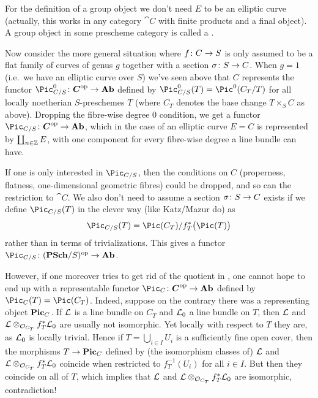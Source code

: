 \documentclass[a4paper,parskip=half,numbers=enddot, DIV=12]{scrreprt}
\begin{document}
	For the definition of a group object we don't need $E$ to be an elliptic curve (actually, this works in any category $\cat C$ with finite products and a final object). A group object in some prescheme category is called a .
	
Now consider the more general situation where $f\colon C\morphism S$ is only assumed to be a flat family of curves of genus $g$ together with a section $\sigma\colon S\morphism C$. When $g=1$ (i.e.\ we have an elliptic curve over $S$) we've seen above that $C$ represents the functor $\Pic_{C/S}^{0}\colon \cat{C}^\op\morphism\cat{Ab}$ defined by $\Pic_{C/S}^0(T)=\Pic^0(C_T/T)$ for all locally noetherian $S$-preschemes $T$ (where $C_T$ denotes the base change $T\times_SC$ as above). Dropping the fibre-wise degree $0$ condition, we get a functor $\Pic_{C/S}\colon \cat{C}^\op\morphism\cat{Ab}$, which in the case of an elliptic curve $E=C$ is represented by $\coprod_{n\in\mathbb{Z}}E$, with one component for every fibre-wise degree a line bundle can have.

If one is only interested in $\Pic_{C/S}$, then the conditions on $C$ (properness, flatness, one-dimensional geometric fibres) could be dropped, and so can the restriction to $\cat{C}$. We also don't need to assume a section $\sigma\colon S\morphism C$ exists if we define $\Pic_{C/S}(T)$ in the clever way (like Katz/Mazur do) as
\begin{align}\lbl{eq:PicCS}
	\Pic_{C/S}(T)=\Pic(C_T)/f_T^*\big(\Pic(T)\big)
\end{align}
rather than in terms of trivializations. This gives a functor $\Pic_{C/S}\colon (\cat{PSch}/S)^\op\morphism\cat{Ab}$.

However, if one moreover tries to get rid of the quotient in , one cannot hope to end up with a representable functor $\Pic_C\colon\cat{C}^\op\morphism\cat{Ab}$ defined by $\Pic_C(T)=\Pic(C_T)$. Indeed, suppose on the contrary there was a representing object $\mathbf{Pic}_C$. If $\mathcal{L}$ is a line bundle on $C_T$ and $\mathcal{L}_0$ a line bundle on $T$, then $\mathcal{L}$ and $\mathcal{L}\otimes_{\mathcal{O}_{C_T}}f_T^*\mathcal{L}_0$ are usually not isomorphic. Yet locally with respect to $T$ they are, as $\mathcal{L}_0$ is locally trivial. Hence if $T=\bigcup_{i\in I}U_i$ is a sufficiently fine open cover, then the morphisms $T\morphism\PIC_C$ defined by (the isomorphism classes of) $\mathcal{L}$ and $\mathcal{L}\otimes_{\mathcal{O}_{C_T}}f_T^*\mathcal{L}_0$ coincide when restricted to $f_T^{-1}(U_i)$ for all $i\in I$. But then they coincide on all of $T$, which implies that $\mathcal{L}$ and $\mathcal{L}\otimes_{\mathcal{O}_{C_T}}f_T^*\mathcal{L}_0$ are isomorphic, contradiction!
\end{document}
